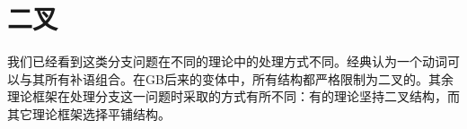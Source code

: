 
\section{二叉}
\label{sec-branching}

我们已经看到这类分支问题在不同的理论中的处理方式不同。经典\xbartc 认为一个动词可以与其所有补语组合。在GB后来的变体中，所有结构都严格限制为二叉的。其余理论框架在处理分支这一问题时采取的方式有所不同：有的理论坚持二叉结构，而其它理论框架选择平铺结构。

